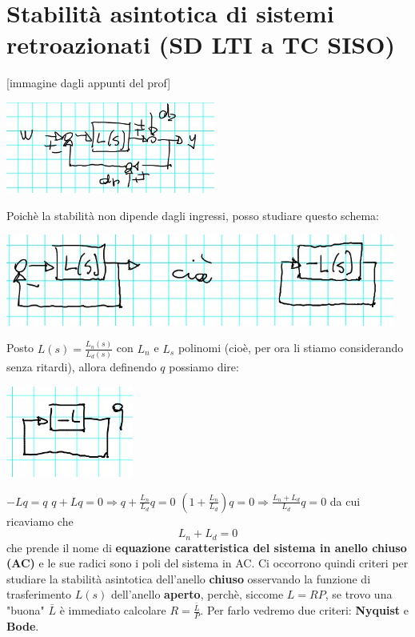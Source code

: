 \section{Stabilità asintotica di sistemi retroazionati (SD LTI a TC SISO)}
[immagine dagli appunti del prof]
\begin{center}
    \includegraphics[height=3cm]{../lezione18/img4.JPG}
\end{center}
Poichè la stabilità non dipende dagli ingressi, posso studiare questo schema:
\begin{center}
    \includegraphics[height=3cm]{../lezione18/img5.JPG}
\end{center}
Posto $L(s) = \frac{L_n(s)}{L_d(s)}$ con $L_n$ e $L_s$ polinomi (cioè, per ora li stiamo considerando senza ritardi), allora definendo $q$ possiamo dire:
\begin{center}
    \includegraphics[height=3cm]{../lezione18/img6.JPG}
\end{center}
$-Lq = q$\newline
$q + Lq = 0 \Rightarrow q + \frac{L_n}{L_d}q = 0$\newline
$(1+\frac{L_n}{L_d}) q = 0 \Rightarrow \frac{L_n+L_d}{L_d}q = 0$\newline
da cui ricaviamo che
\[
    L_n + L_d = 0
\]
che prende il nome di \textbf{equazione caratteristica del sistema in anello chiuso (AC)} e le sue radici sono i poli del sistema in AC.\newline
\newline
Ci occorrono quindi criteri per studiare la stabilità asintotica dell'anello \textbf{chiuso} osservando la funzione di trasferimento $L(s)$ dell'anello \textbf{aperto}, perchè, siccome $L = RP$, se trovo una "buona" $\bar{L}$ è immediato calcolare $R = \frac{\bar{L}}{P}$.\newline
\newline
Per farlo vedremo due criteri: \textbf{Nyquist} e \textbf{Bode}.
